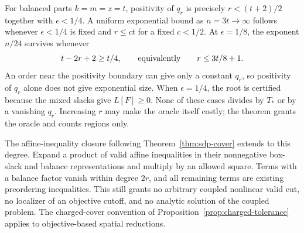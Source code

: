 For balanced parts $k=m=z=t$, positivity of $q_r$ is precisely
$r<(t+2)/2$ together with $\epsilon<1/4$. A uniform exponential
bound as $n=3t\to\infty$ follows whenever $\epsilon<1/4$ is fixed
and $r\le ct$ for a fixed $c<1/2$. At $\epsilon=1/8$, the exponent
$n/24$ survives whenever
\[
 t-2r+2\ge t/4,\qquad\hbox{equivalently}\qquad r\le3t/8+1.
\]
An order near the positivity boundary can give only a constant $q_r$,
so positivity of $q_r$ alone does not give exponential size.
When $\epsilon=1/4$, the root is certified because the mixed slacks give
$L[F]\ge0$. None of these cases divides by $T_*$ or by a vanishing $q_r$.
Increasing $r$ may make the oracle itself costly; the theorem grants the
oracle and counts regions only.

The affine-inequality closure following Theorem~\ref{thm:sdp-cover}
extends to this degree. Expand a product of valid affine inequalities
in their nonnegative box-slack and balance representations and multiply
by an allowed square. Terms with a balance factor vanish within degree
$2r$, and all remaining terms are existing preordering inequalities.
This still grants no arbitrary coupled nonlinear valid cut, no localizer
of an objective cutoff, and no analytic solution of the coupled problem.
The charged-cover convention of Proposition~\ref{prop:charged-tolerance}
applies to objective-based spatial reductions.

